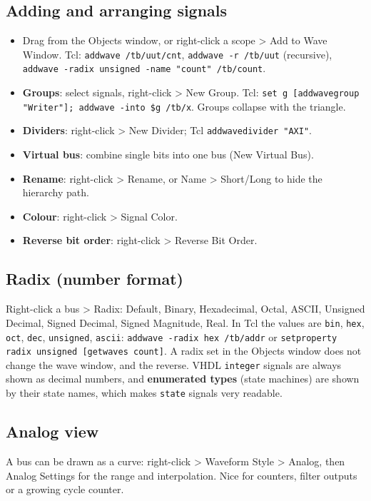\documentclass[11pt,a4paper]{article}
\newcommand{\code}[1]{\texttt{#1}}
\renewcommand{\_}{\oldunderscore\allowbreak{}}
\newcommand{\menu}[1]{\textsf{#1}}
\begin{document}
\subsection{Adding and arranging signals}
\begin{itemize}[nosep]
  \item Drag from the Objects window, or right-click a scope \menu{> Add to Wave Window}. Tcl: \code{add\_wave /tb/uut/cnt}, \code{add\_wave -r /tb/uut} (recursive), \code{add\_wave -radix unsigned -name "count" /tb/count}.
  \item \textbf{Groups}: select signals, right-click \menu{> New Group}. Tcl: \code{set g [add\_wave\_group "Writer"]; add\_wave -into \$g /tb/x}. Groups collapse with the triangle.
  \item \textbf{Dividers}: right-click \menu{> New Divider}; Tcl \code{add\_wave\_divider "AXI"}.
  \item \textbf{Virtual bus}: combine single bits into one bus (\menu{New Virtual Bus}).
  \item \textbf{Rename}: right-click \menu{> Rename}, or \menu{Name > Short/Long} to hide the hierarchy path.
  \item \textbf{Colour}: right-click \menu{> Signal Color}.
  \item \textbf{Reverse bit order}: right-click \menu{> Reverse Bit Order}.
\end{itemize}

\subsection{Radix (number format)}
Right-click a bus \menu{> Radix}: Default, Binary, Hexadecimal, Octal, ASCII, Unsigned Decimal, Signed Decimal, Signed Magnitude, Real. In Tcl the values are \code{bin}, \code{hex}, \code{oct}, \code{dec}, \code{unsigned}, \code{ascii}: \code{add\_wave -radix hex /tb/addr} or \code{set\_property radix unsigned [get\_waves count]}. A radix set in the Objects window does not change the wave window, and the reverse. VHDL \code{integer} signals are always shown as decimal numbers, and \textbf{enumerated types} (state machines) are shown by their state names, which makes \code{state} signals very readable.

\subsection{Analog view}
A bus can be drawn as a curve: right-click \menu{> Waveform Style > Analog}, then \menu{Analog Settings} for the range and interpolation. Nice for counters, filter outputs or a growing cycle counter.
\end{document}

